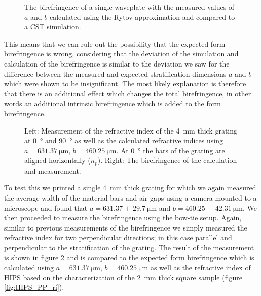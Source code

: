 \begin{figure}[H]
    \centering
    
    \caption{The birefringence of a single waveplate with the measured values of $a$ and $b$ calculated using the Rytov approximation and compared to a CST simulation.}
    \label{fig:CSTvsFormBF}
\end{figure}

This means that we can rule out the possibility that the expected form birefringence is wrong, considering that the deviation of the simulation and calculation of the birefringence is similar to the deviation we saw for the difference between the measured and expected stratification dimensions $a$ and $b$ which were shown to be insignificant. The most likely explanation is therefore that there is an additional effect which changes the total birefringence, in other words an additional intrinsic birefringence which is added to the form birefringence. 

\begin{figure}[H]
    \centering
    
    \caption{Left: Measurement of the refractive index of the \SI{4}{\milli \meter} thick grating at \SI{0}{\degree} and \SI{90}{\degree} as well as the calculated refractive indices using $a=\SI{631.37}{\micro \meter}$, $b=\SI{460.25}{\micro\meter}$. At \SI{0}{\degree} the bars of the grating are aligned horizontally ($n_p$). Right: The birefringence of the calculation and measurement.}
    \label{fig:ri_slim_grating}
\end{figure}

To test this we printed a single \SI{4}{\milli \meter} thick grating for which we again measured the average width of the material bars and air gaps using a camera mounted to a microscope and found that $a=\SI[separate-uncertainty = true]{631.37(2970)}{\micro \meter}$ and $b=\SI[separate-uncertainty = true]{460.25(4231)}{\micro \meter}$. We then proceeded to measure the birefringence using the bow-tie setup. Again, similar to previous measurements of the birefringence we simply measured the refractive index for two perpendicular directions; in this case parallel and perpendicular to the stratification of the grating. The result of the measurement is shown in figure \ref{fig:ri_slim_grating} and is compared to the expected form birefringence which is calculated using $a=\SI{631.37}{\micro \meter}$, $b=\SI{460.25}{\micro \meter}$ as well as the refractive index of HIPS based on the characterization of the \SI{2}{\milli \meter} thick square sample (figure \ref{fig:HIPS_PP_ri}). 

